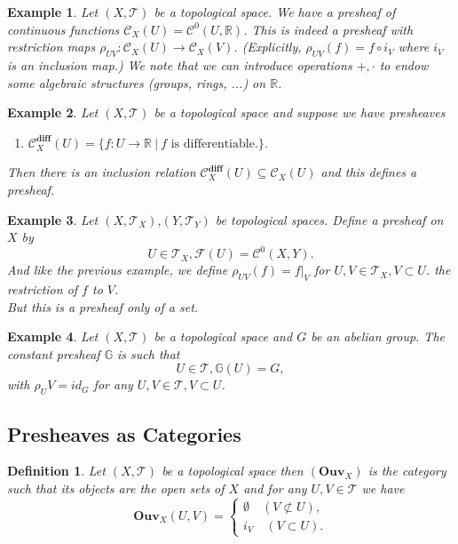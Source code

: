 \documentclass{article}
\newtheorem{definition}{Definition}[section]
\newtheorem{example}{Example}[section]
\numberwithin{equation}{section}
\begin{document}
\begin{example}
Let $(X,\mathcal{T})$ be a topological space. We have a presheaf of continuous functions $\mathcal{C}_X(U)=\mathcal{C}^0(U,\mathbb{R})$. This is indeed a presheaf with restriction maps $\rho_{UV}:\mathcal{C}_X(U)\to\mathcal{C}_X(V)$. (Explicitly, $\rho_{UV}(f) = f\circ i_V$ where $i_V$ is an inclusion map.)  We note that we can introduce operations $+,\cdot$ to endow some algebraic structures (groups, rings, ...) on $\mathbb{R}$.
\end{example}

\begin{example}
Let $(X,\mathcal{T})$ be a topological space and suppose we have presheaves 
\begin{enumerate}[\textbullet]
\item $\mathcal{C}^{\textbf{diff}}_X(U) = \{f:U\to\mathbb{R}\:|\: f\text{ is differentiable.}\}$.
\end{enumerate}
Then there is an inclusion relation $\mathcal{C}^{\textbf{diff}}_X(U)\subseteq\mathcal{C}_X(U)$ and this defines a presheaf.
\end{example}

\begin{example}
Let $(X,\mathcal{T}_X)$,$(Y,\mathcal{T}_Y)$ be topological spaces. Define a presheaf on $X$ by 
\begin{equation*}
U\in\mathcal{T}_X, \mathcal{F}(U) = \mathcal{C}^0(X,Y).
\end{equation*}
And like the previous example, we define $\rho_{UV}(f) = f|_V$ for $U,V\in\mathcal{T}_X, V\subset U$. the restriction of $f$ to $V$. \\
But this is a presheaf only of a set. 
\end{example}

\begin{example}
Let $(X,\mathcal{T})$ be a topological space and $G$ be an abelian group. The constant presheaf $\mathbb{G}$ is such that 
\begin{equation*}
U\in\mathcal{T}, \mathbb{G}(U) = G,
\end{equation*}
with $\rho_UV=id_G$ for any $U,V\in\mathcal{T},V\subset U$. 
\end{example}

\subsection{Presheaves as Categories}

\begin{definition}
Let $(X,\mathcal{T})$ be a topological space then $(\mathbf{Ouv}_X)$ is the category such that its objects are the open sets of $X$ and for any $U,V\in\mathcal{T}$ we have
\begin{equation*}
\mathbf{Ouv}_X(U,V)=
\begin{cases}
\emptyset \quad (V\not\subset U),\\
i_V \quad (V\subset U).
\end{cases}
\end{equation*}
\end{definition}
\end{document}
